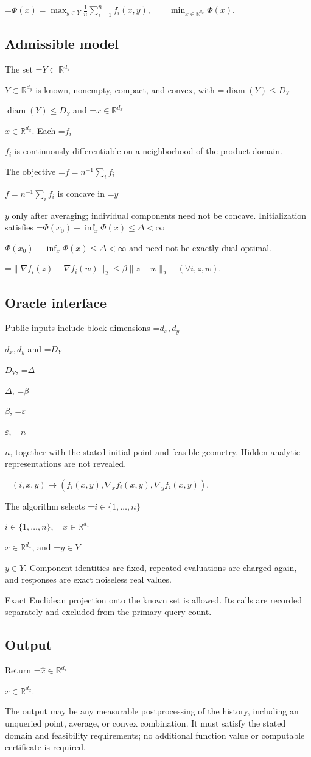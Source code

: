 \documentclass[10pt,a4paper]{article}
\newcommand{\AtlasMath}[1]{\par\begingroup\centering\setbox0=\hbox{$\displaystyle #1$}\ifdim\wd0>1.4\linewidth\typeout{ATLAS WIDE FORMULA: \the\wd0}\fi\ifdim\wd0>\linewidth\resizebox{\linewidth}{!}{\box0}\else\box0\fi\par\endgroup}
\newcommand{\AtlasInlineMath}[1]{\begingroup\setbox0=\hbox{$#1$}\ifdim\wd0>.4\linewidth\endgroup\AtlasMath{#1}\else\endgroup$#1$\fi}
\begin{document}
\AtlasMath{\Phi(x)=\max_{y\in Y}\frac1n\sum_{i=1}^n f_i(x,y),\qquad\min_{x\in\mathbb{R}^{d_x}}\Phi(x).}


\subsection{Admissible model}
The set \AtlasInlineMath{Y\subset\mathbb{R}^{d_y}} is known, nonempty, compact, and convex, with \AtlasInlineMath{\operatorname{diam}(Y)\le D_Y} and \AtlasInlineMath{x\in\mathbb{R}^{d_x}}. Each \AtlasInlineMath{f_i} is continuously differentiable on a neighborhood of the product domain.

The objective \AtlasInlineMath{f=n^{-1}\sum_i f_i} is concave in \AtlasInlineMath{y} only after averaging; individual components need not be concave. Initialization satisfies \AtlasInlineMath{\Phi(x_0)-\inf_x\Phi(x)\le\Delta<\infty} and need not be exactly dual-optimal.


\AtlasMath{\|\nabla f_i(z)-\nabla f_i(w)\|_2\le\beta\|z-w\|_2\quad(\forall i,z,w).}


\subsection{Oracle interface}
Public inputs include block dimensions \AtlasInlineMath{d_x,d_y} and \AtlasInlineMath{D_Y}, \AtlasInlineMath{\Delta}, \AtlasInlineMath{\beta}, \AtlasInlineMath{\varepsilon}, \AtlasInlineMath{n}, together with the stated initial point and feasible geometry. Hidden analytic representations are not revealed.


\AtlasMath{(i,x,y)\longmapsto(f_i(x,y),\nabla_x f_i(x,y),\nabla_y f_i(x,y)).}


The algorithm selects \AtlasInlineMath{i\in\{1,\ldots,n\}}, \AtlasInlineMath{x\in\mathbb{R}^{d_x}}, and \AtlasInlineMath{y\in Y}. Component identities are fixed, repeated evaluations are charged again, and responses are exact noiseless real values.

Exact Euclidean projection onto the known set is allowed. Its calls are recorded separately and excluded from the primary query count.

\subsection{Output}
Return \AtlasInlineMath{\widehat x\in\mathbb R^{d_x}}.

The output may be any measurable postprocessing of the history, including an unqueried point, average, or convex combination. It must satisfy the stated domain and feasibility requirements; no additional function value or computable certificate is required.
\end{document}
